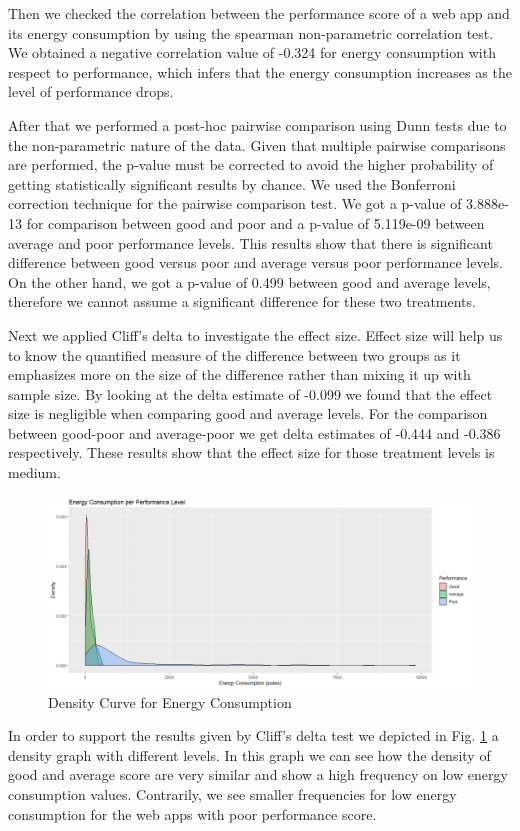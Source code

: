 Then we checked the correlation between the performance score of a web app and its energy consumption by using the spearman non-parametric correlation test. We obtained a negative correlation value of -0.324 for energy consumption with respect to performance, which infers that the energy consumption increases as the level of performance drops. 

After that we performed a post-hoc pairwise comparison using Dunn tests due to the non-parametric nature of the data. Given that multiple pairwise comparisons are performed, the p-value must be corrected to avoid the higher probability of getting statistically significant results by chance.  We used the Bonferroni correction technique for the pairwise comparison test. We got a p-value of 3.888e-13 for comparison between good and poor and a p-value of 5.119e-09 between average and poor performance levels. This results show that  there is significant difference between good versus poor and average versus poor performance levels. On the other hand, we got a p-value of 0.499 between good and average levels, therefore we cannot assume a significant difference for these two treatments.

Next we applied Cliff's delta to investigate the effect size. Effect size will help us to know the quantified measure of the difference between two groups as it emphasizes more on the size of the difference rather than mixing it up with sample size. By looking at the delta estimate of -0.099  we found that the effect size is negligible when comparing good and average levels. For the comparison between good-poor and average-poor we get delta estimates of -0.444 and -0.386 respectively. These results show that the effect size for those treatment levels is medium.

\begin{figure}[H]
  \includegraphics[width=\linewidth]{./NewImages/Fig_11_Density_Curve_Energy_Consumption.png}
  \caption{Density Curve for Energy Consumption}
  \label{fig:density-levels}
\end{figure}

In order to support the results given by Cliff's delta test we depicted in Fig. \ref{fig:density-levels} a density graph with different levels. In this graph we can see how the density of good and average score are very similar and show a high frequency on low energy consumption values. Contrarily, we see smaller frequencies for low energy consumption for the web apps with poor performance score.




